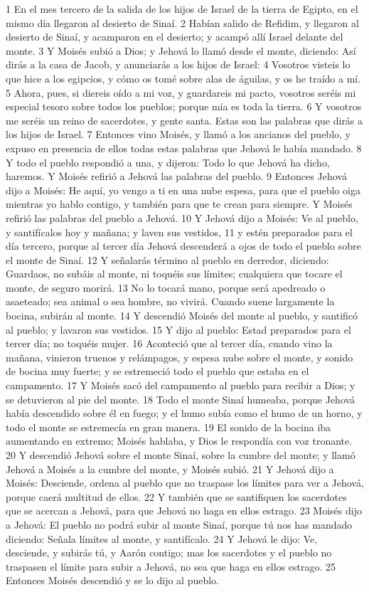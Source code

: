 1 En el mes tercero de la salida de los hijos de Israel de la tierra de Egipto, en el mismo día llegaron al desierto de Sinaí.
2 Habían salido de Refidim, y llegaron al desierto de Sinaí, y acamparon en el desierto; y acampó allí Israel delante del monte.
3 Y Moisés subió a Dios; y Jehová lo llamó desde el monte, diciendo: Así dirás a la casa de Jacob, y anunciarás a los hijos de Israel:
4 Vosotros visteis lo que hice a los egipcios, y cómo os tomé sobre alas de águilas, y os he traído a mí.
5 Ahora, pues, si diereis oído a mi voz, y guardareis mi pacto, vosotros seréis mi especial tesoro sobre todos los pueblos; porque mía es toda la tierra.
6 Y vosotros me seréis un reino de sacerdotes, y gente santa. Estas son las palabras que dirás a los hijos de Israel.
7 Entonces vino Moisés, y llamó a los ancianos del pueblo, y expuso en presencia de ellos todas estas palabras que Jehová le había mandado.
8 Y todo el pueblo respondió a una, y dijeron: Todo lo que Jehová ha dicho, haremos. Y Moisés refirió a Jehová las palabras del pueblo.
9 Entonces Jehová dijo a Moisés: He aquí, yo vengo a ti en una nube espesa, para que el pueblo oiga mientras yo hablo contigo, y también para que te crean para siempre.
Y Moisés refirió las palabras del pueblo a Jehová.
10 Y Jehová dijo a Moisés: Ve al pueblo, y santifícalos hoy y mañana; y laven sus vestidos,
11 y estén preparados para el día tercero, porque al tercer día Jehová descenderá a ojos de todo el pueblo sobre el monte de Sinaí.
12 Y señalarás término al pueblo en derredor, diciendo: Guardaos, no subáis al monte, ni toquéis sus límites; cualquiera que tocare el monte, de seguro morirá.
13 No lo tocará mano, porque será apedreado o asaeteado; sea animal o sea hombre, no vivirá. Cuando suene largamente la bocina, subirán al monte.
14 Y descendió Moisés del monte al pueblo, y santificó al pueblo; y lavaron sus vestidos.
15 Y dijo al pueblo: Estad preparados para el tercer día; no toquéis mujer.
16 Aconteció que al tercer día, cuando vino la mañana, vinieron truenos y relámpagos, y espesa nube sobre el monte, y sonido de bocina muy fuerte; y se estremeció todo el pueblo que estaba en el campamento.
17 Y Moisés sacó del campamento al pueblo para recibir a Dios; y se detuvieron al pie del monte.
18 Todo el monte Sinaí humeaba, porque Jehová había descendido sobre él en fuego; y el humo subía como el humo de un horno, y todo el monte se estremecía en gran manera.
19 El sonido de la bocina iba aumentando en extremo; Moisés hablaba, y Dios le respondía con voz tronante.
20 Y descendió Jehová sobre el monte Sinaí, sobre la cumbre del monte; y llamó Jehová a Moisés a la cumbre del monte, y Moisés subió.
21 Y Jehová dijo a Moisés: Desciende, ordena al pueblo que no traspase los límites para ver a Jehová, porque caerá multitud de ellos.
22 Y también que se santifiquen los sacerdotes que se acercan a Jehová, para que Jehová no haga en ellos estrago.
23 Moisés dijo a Jehová: El pueblo no podrá subir al monte Sinaí, porque tú nos has mandado diciendo: Señala límites al monte, y santifícalo.
24 Y Jehová le dijo: Ve, desciende, y subirás tú, y Aarón contigo; mas los sacerdotes y el pueblo no traspasen el límite para subir a Jehová, no sea que haga en ellos estrago.
25 Entonces Moisés descendió y se lo dijo al pueblo.

